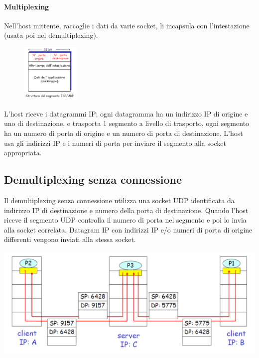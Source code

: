 \documentclass{report}
\begin{document}
	\paragraph{Multiplexing} Nell'host mittente, raccoglie i dati da varie socket, li incapsula con l'intestazione (usata poi nel demultiplexing).
	\newline
	\begin{figure}
		\centering
		\vspace{-20pt}
		\includegraphics[width=0.25\textwidth]{segmento-trasporto}
		\vspace{-30pt}
	\end{figure}
	L’host riceve i datagrammi IP; ogni datagramma ha un indirizzo IP di origine e uno di destinazione, e trasporta 1 segmento a livello di trasporto, ogni segmento ha un numero di porta di origine e un numero di porta di destinazione. L’host usa gli indirizzi IP e i numeri di porta per inviare il segmento alla socket appropriata.
	
	\subsection{Demultiplexing senza connessione}
	Il demultiplexing senza connessione utilizza una socket UDP identificata da indirizzo IP di destinazione e numero della porta di destinazione. Quando l'host riceve il segmento UDP controlla il numero di porta nel segmento e poi lo invia alla socket correlata. Datagram IP con indirizzi IP e/o numeri di porta di origine differenti vengono inviati alla stessa socket.
	\begin{center}
		\includegraphics[width=0.7\linewidth]{socket-udp}
	\end{center}
\end{document}
